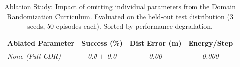 \begin{table}[t]
\centering
\caption{Ablation Study: Impact of omitting individual parameters from the Domain Randomization Curriculum. Evaluated on the held-out test distribution (3 seeds, 50 episodes each). Sorted by performance degradation.}
\label{tab:ablation_results}
\renewcommand{\arraystretch}{1.2}
\begin{tabular}{lccc}
\hline
\textbf{Ablated Parameter} & \textbf{Success (\%)} & \textbf{Dist Error (m)} & \textbf{Energy/Step} \\
\hline
\textit{None (Full CDR)} & \textit{0.0 $\pm$ 0.0} & \textit{0.00} & \textit{0.000} \\
\hline
\hline
\end{tabular}
\end{table}